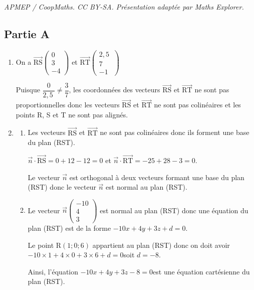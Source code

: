 \documentclass[10pt]{article}
\providecommand{\vect}[1]{\overrightarrow{#1}}
\providecommand{\vectt}[1]{\overrightarrow{\mathrm{#1}}}
\providecommand{\np}[2][]{{#2~#1}}
\begin{document}
\noindent\textit{APMEP / CoopMaths. CC BY-SA. Présentation adaptée par Maths Explorer.}\par\medskip
\subsection*{Partie A}

	\begin{enumerate}
		\item On a $\vectt{RS} \begin{pmatrix}
			0 \\ 3 \\ -4
		\end{pmatrix}$ et $\vectt{RT} \begin{pmatrix}
			\np{2,5} \\ 7 \\ -1
		\end{pmatrix}$

		Puisque $\dfrac{0}{\np{2,5}} \neq \dfrac{3}{7}$, les coordonnées des vecteurs $\vectt{RS}$ et $\vectt{RT}$ ne sont pas proportionnelles donc les vecteurs $\vectt{RS}$ et $\vectt{RT}$ ne sont pas colinéaires et les points R, S et T ne sont pas alignés.

		\item \begin{enumerate}
			\item Les vecteurs $\vectt{RS}$ et $\vectt{RT}$ ne sont pas colinéaires donc ils forment une base du plan (RST).

			$\vect{n}\cdot \vectt{RS} = 0+12-12=0$ \quad et \quad $\vect{n}\cdot \vectt{RT} = -25+28-3=0$.

			Le vecteur $\vect{n}$ est orthogonal à deux vecteurs formant une base du plan (RST) donc le vecteur $\vect{n}$ est normal au plan (RST).

			\item Le vecteur $\vect{n} \begin{pmatrix}-10 \\ 4 \\ 3\end{pmatrix} $ est normal au plan (RST) donc une équation du plan (RST) est de la forme \quad  $-10x+4y+3z+d=0$.

			Le point R$(1;0;6)$ appartient au plan (RST) donc on doit avoir \quad  $-10 \times 1 +4 \times 0 +3 \times 6 + d =0$\quad  soit \quad $d=-8$.

			Ainsi, l'équation \quad $-10x+4y+3z-8=0$\quad est une équation cartésienne du plan (RST).
		\end{enumerate}


\end{enumerate}
\end{document}
